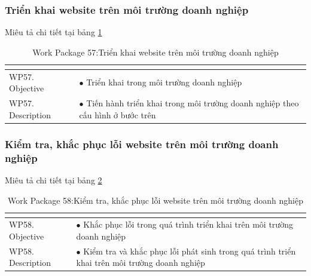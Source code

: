 \documentclass[a4paper]{book}
\begin{document}
\subsubsection{Triển khai website trên môi trường doanh nghiệp} Miêu tả chi tiết tại bảng \ref{table:trienkhai_moitruong_doanhnghiep}
\begin{table}[h!]
	\begin{center}
		\begin{tabular}{|p{4cm}|p{10cm}|}
			\hline
			\multicolumn{2}{|c|}{\cellcolor[HTML]{363636}{\color[HTML]{FFFFFF}Work package 57: Triển khai website trên môi trường doanh nghiệp}}\\
			\hline
			\multirow{1}{*}{WP57. Objective} & $\bullet$ Triển khai trong môi trường doanh nghiệp\\
			\hline
			\multirow{1}{*}{WP57. Description} & $\bullet$ Tiến hành triển khai trong môi trường doanh nghiệp theo cấu hình ở bước trên\\
			\hline
		\end{tabular}
		\caption{Work Package 57:Triển khai website trên môi trường doanh nghiệp}
		\label{table:trienkhai_moitruong_doanhnghiep}
	\end{center}
\end{table}
\subsubsection{Kiểm tra, khắc phục lỗi website trên môi trường doanh nghiệp} Miêu tả chi tiết tại bảng \ref{table:kt_kp_loi_moitruongdoanhnghiep}
\begin{table}[h!]
	\begin{center}
		\begin{tabular}{|p{4cm}|p{10cm}|}
			\hline
			\multicolumn{2}{|c|}{\cellcolor[HTML]{363636}{\color[HTML]{FFFFFF}Work package 58: Kiểm tra, khắc phục lỗi website trên môi trường doanh nghiệp}}\\
			\hline
			\multirow{1}{*}{WP58. Objective} & $\bullet$ Khắc phục lỗi trong quá trình triển khai trên môi trường doanh nghiệp\\
			\hline
			\multirow{1}{*}{WP58. Description} & $\bullet$ Kiểm tra và khắc phục lỗi phát sinh trong quá trình triển khai trên môi trường doanh nghiệp\\
			\hline
		\end{tabular}
		\caption{Work Package 58:Kiểm tra, khắc phục lỗi website trên môi trường doanh nghiệp}
		\label{table:kt_kp_loi_moitruongdoanhnghiep}
	\end{center}
\end{table}
\end{document}
